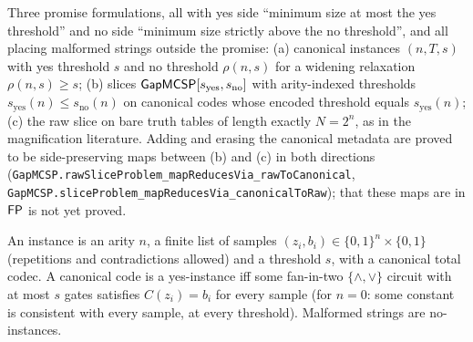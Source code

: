 \begin{definition}[$\cc{GapMCSP}$]
  \label{def:meta-gapmcsp}
  \leanok
  Three promise formulations, all with yes side ``minimum size at most the yes
  threshold'' and no side ``minimum size strictly above the no threshold'',
  and all placing malformed strings outside the promise:
  (a) canonical instances $(n, T, s)$ with yes threshold $s$ and no threshold
  $\rho(n, s)$ for a widening relaxation $\rho(n, s) \ge s$; (b) slices
  $\mathsf{GapMCSP}[s_{\mathrm{yes}}, s_{\mathrm{no}}]$ with arity-indexed
  thresholds $s_{\mathrm{yes}}(n) \le s_{\mathrm{no}}(n)$ on canonical codes
  whose encoded threshold equals $s_{\mathrm{yes}}(n)$; (c) the raw slice on
  bare truth tables of length exactly $N = 2^n$, as in the magnification
  literature. Adding and erasing the
  canonical metadata are proved to be side-preserving maps between (b) and (c)
  in both directions
  (\texttt{GapMCSP.rawSliceProblem\_mapReducesVia\_rawToCanonical},
  \texttt{GapMCSP.sliceProblem\_mapReducesVia\_canonicalToRaw}); that these
  maps are in $\mathsf{FP}$ is not yet proved.
\end{definition}

\begin{definition}[$\cc{SuccinctMCSP}$]
  \label{def:meta-succinct-mcsp}
  \leanok
  An instance is an arity $n$, a finite list of samples $(z_i, b_i) \in
  \{0,1\}^n \times \{0,1\}$ (repetitions and contradictions allowed) and a
  threshold $s$, with a canonical total codec. A canonical code is a
  yes-instance iff some fan-in-two $\{\wedge,\vee\}$ circuit with at most $s$
  gates satisfies $C(z_i) = b_i$ for every sample (for $n = 0$: some constant
  is consistent with every sample, at every threshold). Malformed strings are
  no-instances.
\end{definition}

